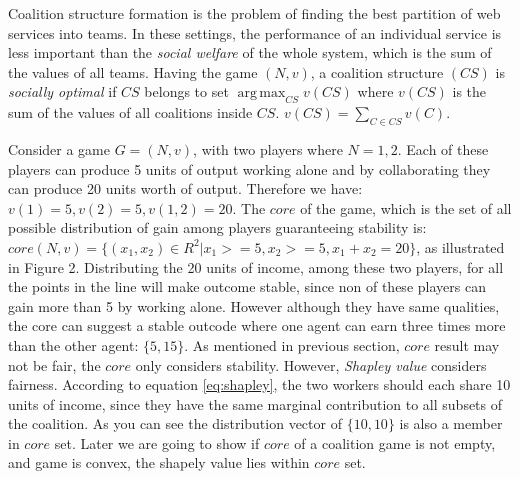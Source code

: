             Coalition structure formation is the problem of finding the best
            partition of web services into teams. In these settings, the
            performance of an individual service is less important than the
            \emph{social welfare} of the whole system, which is the sum of the
            values of all teams. Having the game $(N,v)$, a coalition
            structure $(CS)$ is \emph{socially optimal} if $CS$ belongs to set
            $\operatorname*{arg\,max}_{CS} v(CS)$ where $v(CS)$ is the sum of
            the values of all coalitions inside $CS$. $v(CS) = \sum_{C \in
            CS}v(C)$.



\begin{example}\label{ex:simplecore1}
Consider a game $G = (N, v)$, with two players where $N = {1,2}$.
Each of these players can produce 5 units of output working alone
and by collaborating they can produce 20 units worth of output.
Therefore we have: $v({1}) = 5, v({2}) = 5, v({1,2}) = 20$. The
$core$ of the game, which is the set of all possible distribution
of gain among players guaranteeing stability is: $core(N,v) =
\{(x_1,x_2) \in R^2 | x_1 >= 5, x_2 >= 5, x_1 + x_2 = 20\}$, as
illustrated in Figure 2. Distributing the 20 units of income,
among these two players, for all the points in the line will make
outcome stable, since non of these players can gain more than 5 by
working alone. However although they have same qualities, the core
can suggest a stable outcode where one agent can earn three times
more than the other agent: $\{5,15\}$. As mentioned in previous
section, $core$ result may not be fair, the $core$ only considers
stability. However, \emph{Shapley value} considers fairness.
According to equation \ref{eq:shapley}, the two  workers should
each share 10 units of income, since they have the same marginal
contribution to all subsets of the coalition. As you can see the
distribution vector of $\{10,10\}$ is also a member in $core$ set.
Later we are going to show if $core$ of a coalition game is not
empty, and game is convex, the shapely value lies within $core$
set.
\end{example}

